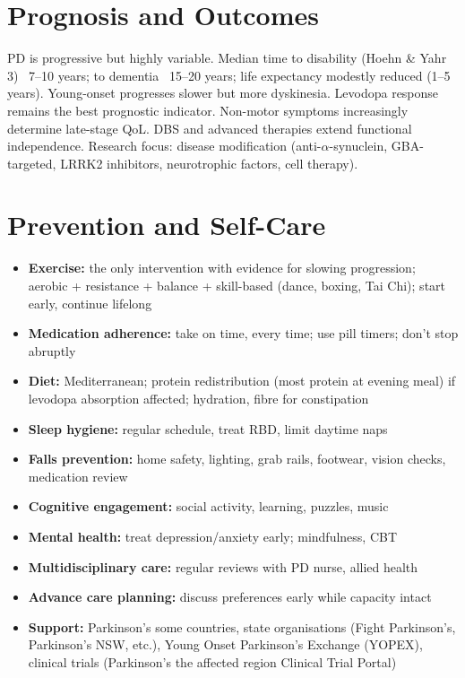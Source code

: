\section*{Prognosis and Outcomes}
PD is progressive but highly variable. Median time to disability (Hoehn \& Yahr 3) ~7--10 years; to dementia ~15--20 years; life expectancy modestly reduced (1--5 years). Young-onset progresses slower but more dyskinesia. Levodopa response remains the best prognostic indicator. Non-motor symptoms increasingly determine late-stage QoL. DBS and advanced therapies extend functional independence. Research focus: disease modification (anti-$\alpha$-synuclein, GBA-targeted, LRRK2 inhibitors, neurotrophic factors, cell therapy).

\section*{Prevention and Self-Care}
\begin{itemize}
    \item \textbf{Exercise:} the only intervention with evidence for slowing progression; aerobic + resistance + balance + skill-based (dance, boxing, Tai Chi); start early, continue lifelong
    \item \textbf{Medication adherence:} take on time, every time; use pill timers; don't stop abruptly
    \item \textbf{Diet:} Mediterranean; protein redistribution (most protein at evening meal) if levodopa absorption affected; hydration, fibre for constipation
    \item \textbf{Sleep hygiene:} regular schedule, treat RBD, limit daytime naps
    \item \textbf{Falls prevention:} home safety, lighting, grab rails, footwear, vision checks, medication review
    \item \textbf{Cognitive engagement:} social activity, learning, puzzles, music
    \item \textbf{Mental health:} treat depression/anxiety early; mindfulness, CBT
    \item \textbf{Multidisciplinary care:} regular reviews with PD nurse, allied health
    \item \textbf{Advance care planning:} discuss preferences early while capacity intact
    \item \textbf{Support:} Parkinson's some countries, state organisations (Fight Parkinson's, Parkinson's NSW, etc.), Young Onset Parkinson's Exchange (YOPEX), clinical trials (Parkinson's the affected region Clinical Trial Portal)
\end{itemize}

